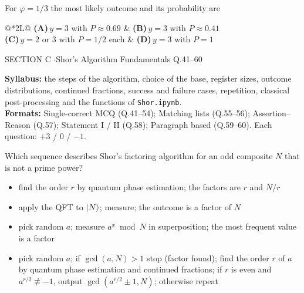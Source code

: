 \documentclass[11pt,a4paper]{article}
\newcommand{\optlabel}[1]{\textbf{(#1)}}
\newenvironment{qitem}[1]{\begin{list}{}{\setlength{\leftmargin}{3.3em}\setlength{\labelwidth}{3.1em}%
  \setlength{\labelsep}{0.2em}\setlength{\topsep}{3pt}\setlength{\parsep}{3pt}}\item[\textbf{Q.#1}\hfill]}{\end{list}}
\newcommand{\qsep}{\par\vspace{2pt}{\color{black!15}\hrule}\vspace{4pt}}
\begin{document}
\begin{qitem}{40}
For $\varphi = 1/3$ the most likely outcome and its probability are
\par\smallskip\noindent\begin{tabularx}{\linewidth}{@{}*{2}{L}@{}}
\optlabel{A}\,$y = 3$ with $P \approx 0.69$ & \optlabel{B}\,$y = 3$ with $P \approx 0.41$ \\[3pt]
\optlabel{C}\,$y = 2$ or $3$ with $P = 1/2$ each & \optlabel{D}\,$y = 3$ with $P = 1$
\end{tabularx}
\end{qitem}
\qsep

\newpage

\begin{sectionbanner}SECTION C \enspace$\cdot$\enspace Shor's Algorithm Fundamentals \hfill Q.41--60\end{sectionbanner}

{\small \textbf{Syllabus:} the steps of the algorithm, choice of the base, register sizes, outcome distributions, continued fractions, success and failure cases, repetition, classical post-processing and the functions of \texttt{Shor.ipynb}.\\ \textbf{Formats:} Single-correct MCQ (Q.41--54); Matching lists (Q.55--56); Assertion--Reason (Q.57); Statement I / II (Q.58); Paragraph based (Q.59--60). Each question: $+3$ / $0$ / $-1$.}
\par\medskip

\begin{qitem}{41}
Which sequence describes Shor's factoring algorithm for an odd composite $N$ that is not a prime power?
\begin{itemize}[leftmargin=2.6em, labelsep=0.4em, itemsep=2pt, topsep=3pt]
\item[\optlabel{A}] find the order $r$ by quantum phase estimation; the factors are $r$ and $N/r$
\item[\optlabel{B}] apply the QFT to $\ket N$; measure; the outcome is a factor of $N$
\item[\optlabel{C}] pick random $a$; measure $a^x \bmod N$ in superposition; the most frequent value is a factor
\item[\optlabel{D}] pick random $a$; if $\gcd(a, N) > 1$ stop (factor found); find the order $r$ of $a$ by quantum phase estimation and continued fractions; if $r$ is even and $a^{r/2} \not\equiv -1$, output $\gcd(a^{r/2} \pm 1, N)$; otherwise repeat
\end{itemize}
\end{qitem}
\qsep
\end{document}

